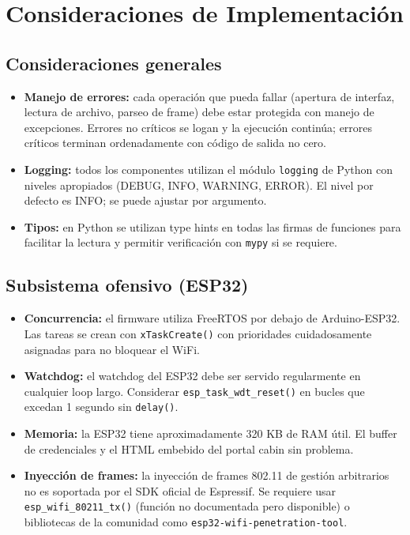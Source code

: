 \documentclass[11pt,a4paper]{article}
\begin{document}
\section{Consideraciones de Implementación}

\subsection{Consideraciones generales}

\begin{itemize}
  \item \textbf{Manejo de errores:} cada operación que pueda fallar
    (apertura de interfaz, lectura de archivo, parseo de frame) debe
    estar protegida con manejo de excepciones. Errores no críticos se
    logan y la ejecución continúa; errores críticos terminan
    ordenadamente con código de salida no cero.
  \item \textbf{Logging:} todos los componentes utilizan el módulo
    \texttt{logging} de Python con niveles apropiados (DEBUG, INFO,
    WARNING, ERROR). El nivel por defecto es INFO; se puede ajustar por
    argumento.
  \item \textbf{Tipos:} en Python se utilizan type hints en todas las
    firmas de funciones para facilitar la lectura y permitir
    verificación con \texttt{mypy} si se requiere.
\end{itemize}

\subsection{Subsistema ofensivo (ESP32)}

\begin{itemize}
  \item \textbf{Concurrencia:} el firmware utiliza FreeRTOS por debajo de
    Arduino-ESP32. Las tareas se crean con \texttt{xTaskCreate()} con
    prioridades cuidadosamente asignadas para no bloquear el WiFi.
  \item \textbf{Watchdog:} el watchdog del ESP32 debe ser servido
    regularmente en cualquier loop largo. Considerar
    \texttt{esp\_task\_wdt\_reset()} en bucles que excedan 1 segundo sin
    \texttt{delay()}.
  \item \textbf{Memoria:} la ESP32 tiene aproximadamente 320 KB de RAM
    útil. El buffer de credenciales y el HTML embebido del portal cabin
    sin problema.
  \item \textbf{Inyección de frames:} la inyección de frames 802.11 de
    gestión arbitrarios no es soportada por el SDK oficial de Espressif.
    Se requiere usar \texttt{esp\_wifi\_80211\_tx()} (función no
    documentada pero disponible) o bibliotecas de la comunidad como
    \texttt{esp32-wifi-penetration-tool}.
\end{itemize}
\end{document}
